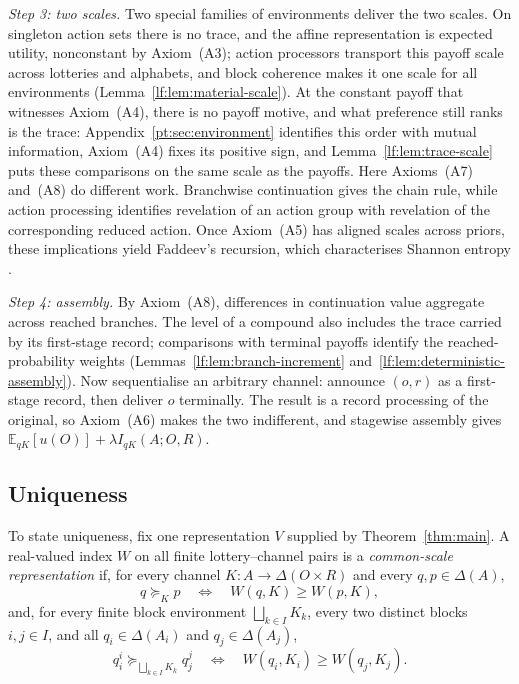 \documentclass[11pt,a4paper]{article}
\theoremstyle{definition}
\newcommand{\D}{\Delta}
\newcommand{\E}{\mathbb E}
\newcommand{\I}{I}
\newcommand{\1}{\mathbf 1}
\begin{document}
\emph{Step 3: two scales.}  Two special families of environments deliver the two scales.  On singleton action
sets there is no trace, and the affine representation is expected utility, nonconstant by
Axiom~\textup{(A3)}; action processors transport this payoff scale across lotteries and alphabets, and block
coherence makes it one scale for all environments (Lemma~\ref{lf:lem:material-scale}).  At the constant payoff
that witnesses Axiom~\textup{(A4)}, there is no payoff motive, and what preference still ranks is the trace:
Appendix~\ref{pt:sec:environment} identifies this order with mutual information, Axiom~\textup{(A4)} fixes its
positive sign, and Lemma~\ref{lf:lem:trace-scale} puts these comparisons on the same scale as the payoffs.
Here Axioms~\textup{(A7)} and~\textup{(A8)} do different work.  Branchwise continuation gives the chain rule,
while action processing identifies revelation of an action group with revelation of the corresponding reduced
action.  Once Axiom~\textup{(A5)} has aligned scales across priors, these implications yield Faddeev's
recursion, which characterises Shannon entropy \cite{Faddeev1956}.

\emph{Step 4: assembly.}  By Axiom~\textup{(A8)}, differences in continuation value aggregate across reached
branches.  The level of a compound also includes the trace carried by its first-stage record; comparisons with
terminal payoffs identify the reached-probability weights (Lemmas~\ref{lf:lem:branch-increment}
and~\ref{lf:lem:deterministic-assembly}).  Now sequentialise an arbitrary channel: announce $(o,r)$ as a
first-stage record, then deliver $o$ terminally.  The result is a record processing of the original, so
Axiom~\textup{(A6)} makes the two indifferent, and stagewise assembly gives
$\E_{qK}[u(O)]+\lambda\I_{qK}(A;O,R)$.

\subsection{Uniqueness}

To state uniqueness, fix one representation $V$ supplied by Theorem~\ref{thm:main}.  A real-valued index $W$ on all
finite lottery--channel pairs is a \emph{common-scale representation} if, for every channel
$K:A\to\D(O\times R)$ and every $q,p\in\D(A)$,
\[
 q\succeq_Kp
 \quad\Longleftrightarrow\quad
 W(q,K)\ge W(p,K),
\]
and, for every finite block environment $\bigsqcup_{k\in I}K_k$, every two distinct blocks $i,j\in I$, and all
$q_i\in\D(A_i)$ and $q_j\in\D(A_j)$,
\[
 q_i^i\succeq_{\bigsqcup_{k\in I}K_k}q_j^j
 \quad\Longleftrightarrow\quad
 W(q_i,K_i)\ge W(q_j,K_j).
\]
\end{document}
